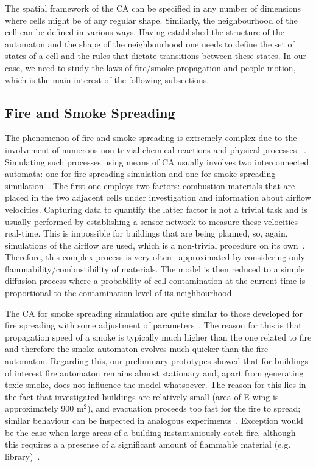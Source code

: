 The spatial framework of the CA can be specified in any number of dimensions
where cells might be of any regular shape.
Similarly, the neighbourhood of the cell can be defined in various ways.
Having established the structure of the automaton and the shape of the
neighbourhood one needs to define the set of states of a cell and the rules
that dictate transitions between these states.
In our case, we need to study the laws of fire/smoke propagation and people
motion, which is the main interest of the following subsections.

\subsection{Fire and Smoke Spreading}
The phenomenon of fire and smoke spreading is extremely complex due to the
involvement of numerous non-trivial chemical reactions and physical processes
~\cite{Ying, Curiac}.
Simulating such processes using means of CA usually involves two interconnected
automata: one for fire spreading simulation and one for smoke spreading
simulation~\cite{Curiac}.
The first one employs two factors: combustion materials that are placed in the
two adjacent cells under investigation and information about airflow velocities.
Capturing data to quantify the latter factor is not a trivial task and is
usually performed by establishing a sensor network to measure these velocities
real-time.
This is impossible for buildings that are being planned, so, again, simulations
of the airflow are used, which is a non-trivial procedure on its
own~\cite{Airflow}.
Therefore, this complex process is very often~\cite{Tissera1, Tissera2}
approximated by considering only flammability/combustibility of materials.
The model is then reduced to a simple diffusion process where a probability of
cell contamination at the current time is proportional to the contamination
level of its neighbourhood.

The CA for smoke spreading simulation are quite similar to those developed for
fire spreading with some adjustment of parameters~\cite{Curiac}.
The reason for this is that propagation speed of a smoke is typically much higher
than the one related to fire and therefore the smoke automaton evolves much
quicker than the fire automaton.
Regarding this, our preliminary prototypes showed that for buildings of
interest fire automaton remains almost stationary and, apart from generating
toxic smoke, does not influence the model whatsoever.
The reason for this lies in the fact that investigated buildings are relatively
small (area of E wing is approximately 900 m$^2$), and evacuation proceeds too
fast for the fire to spread; similar behaviour can be inspected in analogous
experiments~\cite{Tissera1}.
Exception would be the case when large areas of a building instantaniously catch
fire, although this requires a a presense of a significant amount of flammable 
material (e.g. library)~\cite{Tissera2}.

